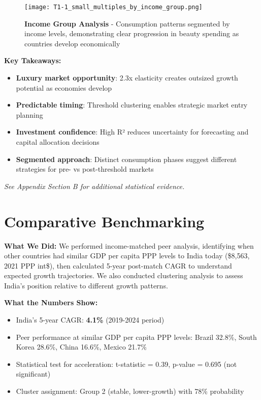 \documentclass[11pt]{article}
\begin{document}
\begin{figure}[H]
\centering
\texttt{[image: T1-1\_small\_multiples\_by\_income\_group.png]}
\caption{\textbf{Income Group Analysis} - Consumption patterns segmented by income levels, demonstrating clear progression in beauty spending as countries develop economically}
\end{figure}

\textbf{Key Takeaways:}
\vspace{-5pt}
\begin{itemize}
    \setlength{\itemsep}{-2pt}
    \item \textbf{Luxury market opportunity}: 2.3x elasticity creates outsized growth potential as economies develop
    \item \textbf{Predictable timing}: Threshold clustering enables strategic market entry planning
    \item \textbf{Investment confidence}: High R² reduces uncertainty for forecasting and capital allocation decisions
    \item \textbf{Segmented approach}: Distinct consumption phases suggest different strategies for pre- vs post-threshold markets
\end{itemize}
\textit{See Appendix Section B for additional statistical evidence.}

\section{Comparative Benchmarking}

\textbf{What We Did:} We performed income-matched peer analysis, identifying when other countries had similar GDP per capita PPP levels to India today (\$8,563, 2021 PPP int\$), then calculated 5-year post-match CAGR to understand expected growth trajectories. We also conducted clustering analysis to assess India's position relative to different growth patterns.

\textbf{What the Numbers Show:}
\vspace{-5pt}
\begin{itemize}
    \setlength{\itemsep}{-2pt}
    \item India's 5-year CAGR: \textbf{4.1\%} (2019-2024 period)
    \item Peer performance at similar GDP per capita PPP levels: Brazil 32.8\%, South Korea 28.6\%, China 16.6\%, Mexico 21.7\%
    \item Statistical test for acceleration: t-statistic = 0.39, p-value = 0.695 (not significant)
    \item Cluster assignment: Group 2 (stable, lower-growth) with 78\% probability
\end{itemize}
\end{document}

